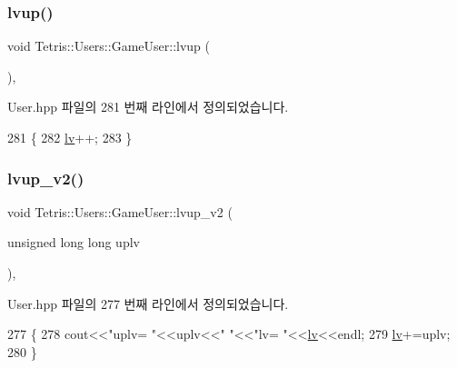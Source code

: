 \subsubsection{\texorpdfstring{lvup()}{lvup()}}
{\footnotesize\ttfamily void Tetris\+::\+Users\+::\+Game\+User\+::lvup (\begin{DoxyParamCaption}{ }\end{DoxyParamCaption})\hspace{0.3cm}{\ttfamily [inline]}, {\ttfamily [protected]}}



User.\+hpp 파일의 281 번째 라인에서 정의되었습니다.


\begin{DoxyCode}
281                        \{
282                 \hyperlink{class_tetris_1_1_users_1_1_game_user_a11a2856fee30a69a19550b42c041a312}{lv}++;
283             \}
\end{DoxyCode}
\mbox{\label{class_tetris_1_1_users_1_1_game_user_aacc605ed22d2b982a106659ef94fb3c9}} 
\subsubsection{\texorpdfstring{lvup\+\_\+v2()}{lvup\_v2()}}
{\footnotesize\ttfamily void Tetris\+::\+Users\+::\+Game\+User\+::lvup\+\_\+v2 (\begin{DoxyParamCaption}\item[{unsigned long long}]{uplv }\end{DoxyParamCaption})\hspace{0.3cm}{\ttfamily [inline]}, {\ttfamily [protected]}}



User.\+hpp 파일의 277 번째 라인에서 정의되었습니다.


\begin{DoxyCode}
277                                                  \{
278                 cout<<\textcolor{stringliteral}{"uplv= "}<<uplv<<\textcolor{stringliteral}{"  "}<<\textcolor{stringliteral}{"lv= "}<<\hyperlink{class_tetris_1_1_users_1_1_game_user_a11a2856fee30a69a19550b42c041a312}{lv}<<endl;
279                 \hyperlink{class_tetris_1_1_users_1_1_game_user_a11a2856fee30a69a19550b42c041a312}{lv}+=uplv;
280             \}
\end{DoxyCode}
\mbox{\label{class_tetris_1_1_users_1_1_game_user_a442b35545b13a23dca566cf1b43eb82d}} 
